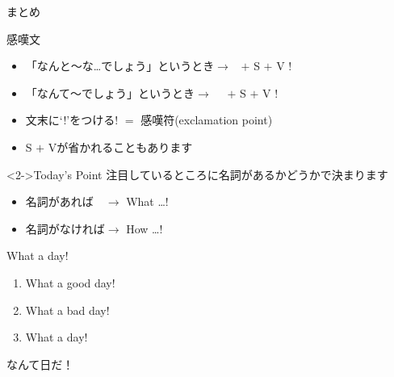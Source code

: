 \documentclass[aspectratio=169,xcolor={dvipsnames,table}]{beamer}
\begin{document}
\begin{frame}[plain]{まとめ}
 
\begin{block}{感嘆文}
\pause
\begin{itemize}[square]\small
 \item \noindent{}「なんと～な\ldots{}でしょう」というとき$\longrightarrow$\,\,\,%
 $+$ S $+$ V !
 \item \noindent{}「なんて～でしょう」というとき$\longrightarrow$\,\,\,%
\,\,\,$+$ S $+$ V !
 \item   文末に`!'をつける\hfill{\scriptsize ! $=$ 感嘆符(exclamation point)}
 \item S $+$ Vが省かれることもあります

\end{itemize}
     \end{block}

\begin{block}<2->{Today's Point}\small
注目しているところに名詞があるかどうかで決まります
\begin{itemize}[square]\small
 \item 名詞があれば　$\longrightarrow$ What \ldots !
 \item 名詞がなければ$\longrightarrow$ How \ldots !
\end{itemize}
\end{block}
\end{frame}

\begin{frame}[plain]{What a day!}
\begin{enumerate}\large
 \item What a good day!
 \item What a bad day!
 \item What a day!
\end{enumerate}
\pause\vfill
 \Huge\centering
なんて日だ！
\end{frame}
\end{document}
